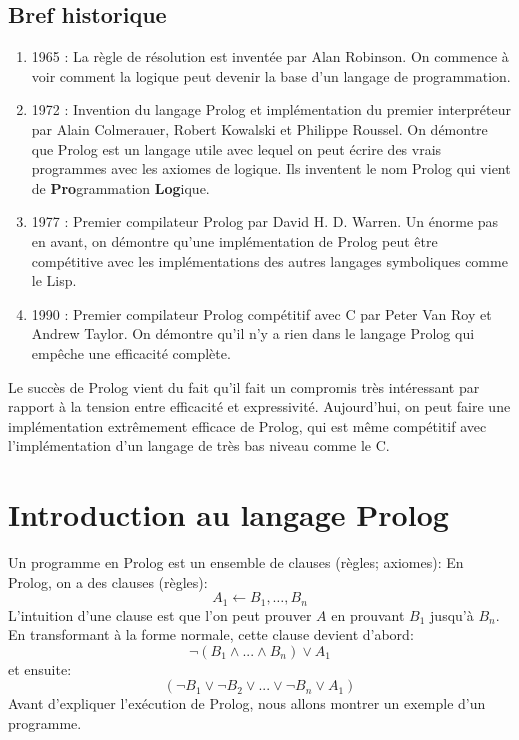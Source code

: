\subsection{Bref historique}

\begin{enumerate}
	\item 1965 : 	La règle de résolution est inventée par Alan Robinson.
On commence à voir comment la logique peut devenir la base d'un langage de programmation.
	\item 1972 :	Invention du langage Prolog et implémentation du premier interpréteur
par Alain Colmerauer, Robert Kowalski et Philippe Roussel. 
On démontre que Prolog est un langage utile avec lequel on peut écrire des vrais programmes
avec les axiomes de logique.
Ils inventent le nom Prolog qui vient de {\bf Pro}grammation {\bf Log}ique.
        \item 1977 :    Premier compilateur Prolog par David H. D. Warren.
Un énorme pas en avant, on démontre qu'une implémentation de Prolog peut être compétitive
avec les implémentations des autres langages symboliques comme le Lisp.
        \item 1990 :    Premier compilateur Prolog compétitif avec C par Peter Van Roy et Andrew Taylor.
On démontre qu'il n'y a rien dans le langage Prolog qui empêche une efficacité complète.
\end{enumerate}
Le succès de Prolog vient du fait qu'il fait
un compromis très intéressant par rapport à la tension entre efficacité et expressivité.
Aujourd'hui, on peut faire une implémentation extrêmement efficace de Prolog, qui est même compétitif avec
l'implémentation d'un langage de très bas niveau comme le C.

\section{Introduction au langage Prolog}

Un programme en Prolog est un ensemble de clauses (règles; axiomes):
En Prolog, on a des clauses (règles):
	\begin{equation}
		 A_1 \leftarrow B_1, … , B_n
	\end{equation}
L'intuition d'une clause est que l'on peut prouver $A$ en prouvant $B_1$ jusqu'à $B_n$.
En transformant à la forme normale, cette clause devient d'abord:
	 \begin{equation}
	 	\neg (B_{1} \wedge ... \wedge B_{n}) \vee A_{1}
	 \end{equation}
et ensuite:
	 \begin{equation}
	 	 (\neg B_{1} \vee \neg B_{2} \vee ... \vee \neg B_{n} \vee A_{1})
	 \end{equation}
Avant d'expliquer l'exécution de Prolog, nous allons montrer un exemple d'un programme.

